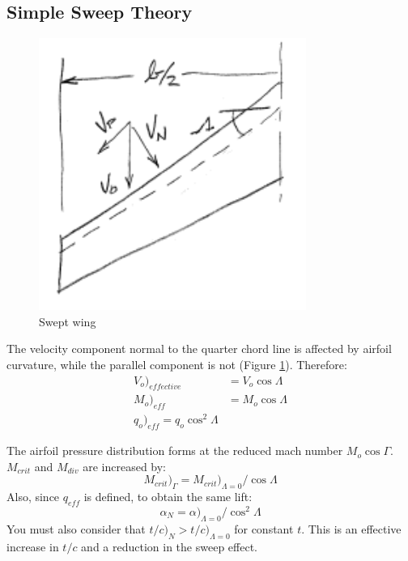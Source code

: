 \documentclass[draft=false, titlepage]{article}
\begin{document}
\subsection{Simple Sweep Theory}
\begin{figure}[ht]
	\centering
	\includegraphics[width=0.3\linewidth]{Figures/p59_sweptWing.PNG}
	\caption{Swept wing}
	\label{fig:p59_sweptWing}
\end{figure}
The velocity component normal to the quarter chord line is affected by airfoil curvature, while the parallel component is not (Figure \ref{fig:p59_sweptWing}). Therefore:
\begin{align*}
V_o\Big)_{effective} &= V_o\cos\Lambda\\
M_o\Big)_{eff} &= M_o\cos\Lambda\\
q_o\Big)_{eff} = q_o\cos^2\Lambda
\end{align*}

The airfoil pressure distribution forms at the reduced mach number $M_o\cos\Gamma$. $M_{crit}$ and $M_{div}$ are increased by:
\begin{equation}
M_{crit}\Big)_\Gamma = M_{crit} \Big)_{\Lambda=0}/\cos\Lambda
\end{equation}
Also, since $q_{eff}$ is defined, to obtain the same lift:
\begin{equation}
\alpha_N = \alpha \big)_{\Lambda=0}/\cos^2\Lambda
\end{equation}
You must also consider that $t/c\Big)_N > t/c)_{\Lambda=0}$ for constant $t$. This is an effective increase in $t/c$ and a reduction in the sweep effect.

\end{document}
